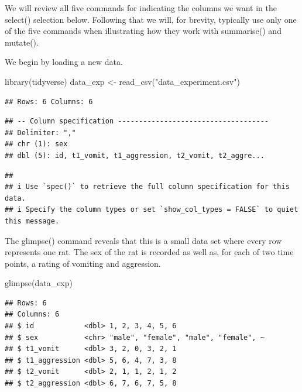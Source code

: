 \documentclass[
]{krantz}
\makeatletter
\newenvironment{Shaded}{\begin{snugshade}}{\end{snugshade}}
\newcommand{\FunctionTok}[1]{\textcolor[rgb]{0,0,0}{#1}}
\newcommand{\NormalTok}[1]{#1}
\newcommand{\OtherTok}[1]{\textcolor[rgb]{0.37,0.37,0.37}{#1}}
\newcommand{\StringTok}[1]{\textcolor[rgb]{0.5,0.5,0.5}{#1}}
\newenvironment{kframe}{%
\medskip{}
\setlength{\fboxsep}{.8em}
 \def\at@end@of@kframe{}%
 \ifinner\ifhmode%
  \def\at@end@of@kframe{\end{minipage}}%
  \begin{minipage}{\columnwidth}%
 \fi\fi%
 \def\FrameCommand##1{\hskip\@totalleftmargin \hskip-\fboxsep
 \colorbox{shadecolor}{##1}\hskip-\fboxsep
     \hskip-\linewidth \hskip-\@totalleftmargin \hskip\columnwidth}%
 \MakeFramed {\advance\hsize-\width
   \@totalleftmargin\z@ \linewidth\hsize
   \@setminipage}}%
 {\par\unskip\endMakeFramed%
 \at@end@of@kframe}
\renewenvironment{Shaded}{\begin{kframe}}{\end{kframe}}
\makeatother
\begin{document}
We will review all five commands for indicating the columns we want in the select() selection below. Following that we will, for brevity, typically use only one of the five commands when illustrating how they work with summarise() and mutate().

We begin by loading a new data.

\begin{Shaded}
\begin{Highlighting}[]
\FunctionTok{library}\NormalTok{(tidyverse)}
\NormalTok{data\_exp }\OtherTok{\textless{}{-}} \FunctionTok{read\_csv}\NormalTok{(}\StringTok{"data\_experiment.csv"}\NormalTok{)}
\end{Highlighting}
\end{Shaded}

\begin{verbatim}
## Rows: 6 Columns: 6
\end{verbatim}

\begin{verbatim}
## -- Column specification ------------------------------------
## Delimiter: ","
## chr (1): sex
## dbl (5): id, t1_vomit, t1_aggression, t2_vomit, t2_aggre...
\end{verbatim}

\begin{verbatim}
## 
## i Use `spec()` to retrieve the full column specification for this data.
## i Specify the column types or set `show_col_types = FALSE` to quiet this message.
\end{verbatim}

The glimpse() command reveals that this is a small data set where every row represents one rat. The sex of the rat is recorded as well as, for each of two time points, a rating of vomiting and aggression.

\begin{Shaded}
\begin{Highlighting}[]
\FunctionTok{glimpse}\NormalTok{(data\_exp)}
\end{Highlighting}
\end{Shaded}

\begin{verbatim}
## Rows: 6
## Columns: 6
## $ id            <dbl> 1, 2, 3, 4, 5, 6
## $ sex           <chr> "male", "female", "male", "female", ~
## $ t1_vomit      <dbl> 3, 2, 0, 3, 2, 1
## $ t1_aggression <dbl> 5, 6, 4, 7, 3, 8
## $ t2_vomit      <dbl> 2, 1, 1, 2, 1, 2
## $ t2_aggression <dbl> 6, 7, 6, 7, 5, 8
\end{verbatim}
\end{document}
